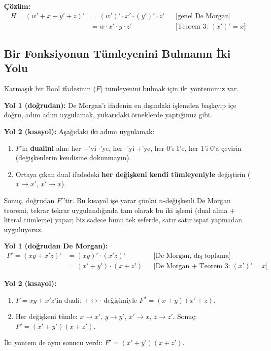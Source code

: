 \noindent\textbf{Çözüm:}
\begin{align*}
H=(w'+x+y'+z)' &= (w')'\cdot x'\cdot(y')'\cdot z' & &\text{[genel De Morgan]}\\
    &= w\cdot x'\cdot y\cdot z' & &\text{[Teorem 3: } (x')'=x \text{]}
\end{align*}

\subsection{Bir Fonksiyonun Tümleyenini Bulmanın İki Yolu}
\label{sec:tumleyenin-iki-yolu}

Karmaşık bir Bool ifadesinin ($F$) tümleyenini bulmak için iki yöntemimiz var.

\textbf{Yol 1 (doğrudan):} De Morgan'ı ifadenin en dışındaki işlemden başlayıp içe doğru,
adım adım uygulamak, yukarıdaki örneklerde yaptığımız gibi.

\textbf{Yol 2 (kısayol):} Aşağıdaki iki adımı uygulamak:
\begin{enumerate}[nosep, leftmargin=*]
    \item $F$'in \textbf{dualini} alın: her $+$'yi $\cdot$'ye, her $\cdot$'yi $+$'ye, her
    $0$'ı $1$'e, her $1$'i $0$'a çevirin (değişkenlerin kendisine dokunmayın).
    \item Ortaya çıkan dual ifadedeki \textbf{her değişkeni kendi tümleyeniyle}
    değiştirin ($x\to x'$, $x'\to x$).
\end{enumerate}
Sonuç, doğrudan $F'$'tir. Bu kısayol işe yarar çünkü $n$-değişkenli De Morgan teoremi,
tekrar tekrar uygulandığında tam olarak bu iki işlemi (dual alma + literal tümleme) yapar;
biz sadece bunu tek seferde, satır satır ispat yapmadan uyguluyoruz.

\begin{ornek}[İki Yöntemin Karşılaştırılması: $F=xy+x'z$]
\textbf{Yol 1 (doğrudan De Morgan):}
\begin{align*}
F' = (xy+x'z)' &= (xy)'\cdot(x'z)' & &\text{[De Morgan, dış toplama]}\\
    &= (x'+y')\cdot(x+z') & &\text{[De Morgan + Teorem 3: } (x')'=x \text{]}
\end{align*}

\textbf{Yol 2 (kısayol):}
\begin{enumerate}[nosep, leftmargin=*]
    \item $F=xy+x'z$'in duali: $+\leftrightarrow\cdot$ değişimiyle $F^d=(x+y)(x'+z)$.
    \item Her değişkeni tümle: $x\to x'$, $y\to y'$, $x'\to x$, $z\to z'$. Sonuç:
    $F'=(x'+y')(x+z')$.
\end{enumerate}

İki yöntem de aynı sonucu verdi: $F'=(x'+y')(x+z')$.
\end{ornek}

